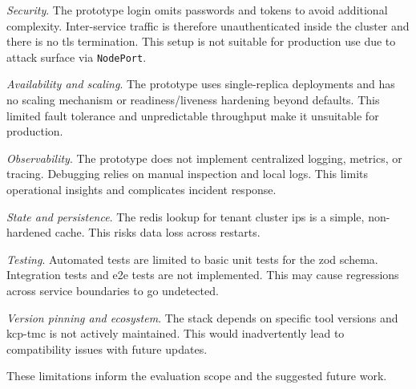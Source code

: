 \documentclass[11pt, a4paper, oneside, listof=totoc]{scrartcl}
\begin{document}
\begin{enumerate}[label={[\arabic*]:},
                    ref=Challenge~\arabic*,
                    leftmargin=*,
                    itemsep=0.6\baselineskip]
                    \item\label{chal:securityRisks}
                        \textit{Security}.
                        The prototype login omits passwords and tokens to avoid additional
                        complexity.
                        Inter-service traffic is therefore unauthenticated inside the cluster and
                        there is no \gls{tls} termination.
                        This setup is not suitable for production use due to attack surface via
                        \texttt{NodePort}.

                    \item\label{chal:availabilityAndScaling}
                        \textit{Availability and scaling}.
                        The prototype uses single-replica deployments and has no scaling mechanism
                        or readiness/liveness hardening beyond defaults.
                        This limited fault tolerance and unpredictable throughput make it unsuitable
                        for production.

                    \item\label{chal:observability}
                        \textit{Observability}.
                        The prototype does not implement centralized logging, metrics, or tracing.
                        Debugging relies on manual inspection and local logs.
                        This limits operational insights and complicates incident response.

                    \item\label{chal:stateAndPersistence}
                        \textit{State and persistence}.
                        The \gls{redis} lookup for tenant cluster \glspl{ip} is a simple, non-hardened
                        cache.
                        This risks data loss across restarts.

                    \item\label{chal:testing}
                        \textit{Testing}.
                        Automated tests are limited to basic unit tests for the zod schema.
                        Integration tests and \gls{e2e} tests are not implemented.
                        This may cause regressions across service boundaries to go undetected.

                    \item\label{chal:versionPinning}
                        \textit{Version pinning and ecosystem}.
                        The stack depends on specific tool versions and \gls{kcp}-\gls{tmc} is not
                        actively maintained.
                        This would inadvertently lead to compatibility issues with future updates.
            \end{enumerate}
            These limitations inform the evaluation scope and the suggested future work.
\end{document}
